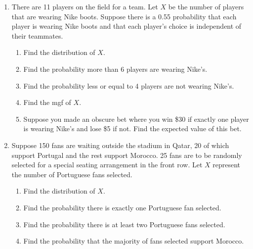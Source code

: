 \documentclass{article}
\begin{document}
\begin{enumerate}
    \item There are 11 players on the field for a team. Let $X$ be the number of players that are wearing Nike boots. Suppose there is a 0.55 probability that each player is wearing Nike boots and that each player's choice is independent of their teammates.\bigskip
        \begin{enumerate}
        \item Find the distribution of $X$.\vspace{50pt}
        \item Find the probability more than 6 players are wearing Nike's.\vspace{50pt}
        \item Find the probability less or equal to 4 players are not wearing Nike's.\vspace{50pt}
        \item Find the mgf of $X$.\vspace{50pt}
        \item Suppose you made an obscure bet where you win \$30 if exactly one player is wearing Nike's and lose \$5 if not. Find the expected value of this bet.\vspace{100pt}
    \end{enumerate}\bigskip
    
    \newpage
    
    \item Suppose 150 fans are waiting outside the stadium in Qatar, 20 of which support Portugal and the rest support Morocco. 25 fans are to be randomly selected for a special seating arrangement in the front row. Let $X$ represent the number of Portuguese fans selected.\bigskip
    \begin{enumerate}
        \item Find the distribution of $X$.\vspace{60pt}
        \item Find the probability there is exactly one Portuguese fan selected.\vspace{60pt}
        \item Find the probability there is at least two Portuguese fans selected. \vspace{60pt}
        \item Find the probability that the majority of fans selected support Morocco.\vspace{60pt}
    \end{enumerate}\bigskip
    

\end{enumerate}
\end{document}
